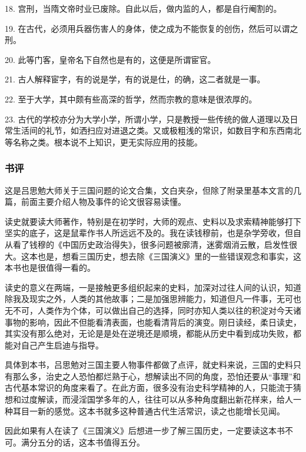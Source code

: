 18. 宫刑，当隋文帝时业已废除。自此以后，做内监的人，都是自行阉割的。

19. 在古代，必须用兵器伤害人的身体，使之成为不能恢复的创伤，然后可以谓之刑。

20. 此等门客，皇帝名下自然也是有的，这便是所谓宦官。

21. 古人解释宦字，有的说是学，有的说是仕，的确，这二者就是一事。

22. 至于大学，其中颇有些高深的哲学，然而宗教的意味是很浓厚的。

23. 古代的学校亦分为大学小学，所谓小学，只是教授一些传统的做人道理以及日常生活间的礼节，如洒扫应对进退之类。又或极粗浅的常识，如数目字和东西南北等名称之类。根本说不上知识，更无实际应用的技能。

\subsubsection{书评}
这是吕思勉大师关于三国问题的论文合集，文白夹杂，但除了附录里基本文言的几篇，前面主要介绍人物及事件的论文很容易读懂。

读史就要读大师著作，特别是在初学时，大师的观点、史料以及求索精神能够打下坚实的底子，这是鼠辈作书人所远远不及的。我在读钱穆前，也是杂学旁收，但自从看了钱穆的《中国历史政治得失》，很多问题被廓清，迷雾烟消云散，启发性很大。这本也是，想看三国历史，想去除《三国演义》里的一些错误观念和事实，这本书也是很值得一看的。

读史的意义在两端，一是接触更多组织起来的史料，加深对过往人间的认识，知道除我及现实之外，人类的其他故事；二是加强思辨能力，知道但凡一件事，无可也无不可，人类作为个体，可以做出自己的选择，同时亦知人类以往的积淀对今天诸事物的影响，因此不但能看清表面，也能看清背后的演变。刚日读经，柔日读史，其实没有那么绝对，无论是是处在逆境还是顺境，都能从历史中看到成功失败，都能对自己产生启迪与指导。

具体到本书，吕思勉对三国主要人物事件都做了点评，就史料来说，三国的史料只有那么多，治史之人恐怕都烂熟于心，想解读出不同的角度，恐怕还要从“事理”和古代基本常识的角度来看了。在此方面，很多没有治史科学精神的人，只能流于猜想和过度解读，而浸淫国学多年的人，往往可以从多种角度翻出新花样来，给人一种耳目一新的感觉。这本书就多这种普通古代生活常识，读之也能增长见闻。

因此如果有人在读了《三国演义》后想进一步了解三国历史，一定要读这本书不可。满分五分的话，这本书值得五分。